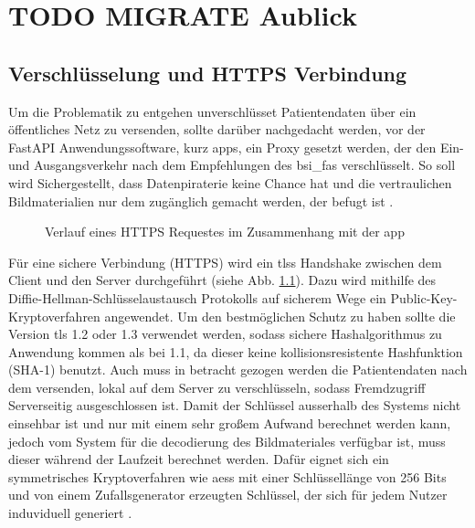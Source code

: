 \chapter{TODO MIGRATE Aublick}\label{ausblick}


\section{Verschlüsselung und HTTPS Verbindung}\label{encryption}
Um die Problematik zu entgehen unverschlüsset Patientendaten über ein öffentliches Netz zu versenden, sollte darüber nachgedacht werden, vor der FastAPI Anwendungssoftware, kurz \Acp{app}, ein Proxy gesetzt werden, der den Ein- und Ausgangsverkehr nach dem Empfehlungen des \Acp{bsi_fa} verschlüsselt. So soll wird Sichergestellt, dass Datenpiraterie keine Chance hat und die vertraulichen Bildmaterialien nur dem zugänglich gemacht werden, der befugt ist \cite{fastapi} \cite{bsi}.

\begin{figure}[h]
\begin{center}
 
\caption[FastAPI HTTPS Request Verlauf]{Verlauf eines HTTPS Requestes im Zusammenhang mit der \ac{app} \cite{fastapi}}\label{cap:fastapi}
\end{center}
\end{figure}\label{fig:fastapi}

Für eine sichere Verbindung (HTTPS) wird ein \Acp{tls} Handshake zwischen dem Client und den Server durchgeführt (siehe Abb. \ref{cap:fastapi}). Dazu wird mithilfe des Diffie-Hellman-Schlüsselaustausch Protokolls auf sicherem Wege ein Public-Key-Kryptoverfahren angewendet. Um den bestmöglichen Schutz zu haben sollte die Version \ac{tls} 1.2 oder 1.3 verwendet werden, sodass sichere Hashalgorithmus zu Anwendung kommen als bei 1.1, da dieser keine kollisionsresistente Hashfunktion (SHA-1) benutzt. Auch muss in betracht gezogen werden die Patientendaten nach dem versenden, lokal auf dem Server zu verschlüsseln, sodass Fremdzugriff Serverseitig ausgeschlossen ist. Damit der Schlüssel ausserhalb des Systems nicht einsehbar ist und nur mit einem sehr großem Aufwand berechnet werden kann, jedoch vom System für die decodierung des Bildmateriales verfügbar ist, muss dieser während der Laufzeit berechnet werden. Dafür eignet sich ein symmetrisches Kryptoverfahren wie \Acp{aes} mit einer Schlüssellänge von 256 Bits und von einem Zufallsgenerator erzeugten Schlüssel, der sich für jedem Nutzer induviduell generiert \cite{bsi}.

